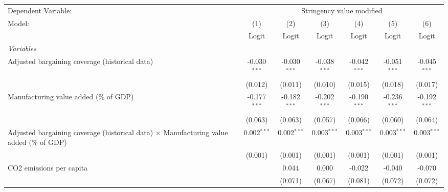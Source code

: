 
\begingroup
\centering
\begin{tabular}{lcccccc}
   \toprule
   Dependent Variable: & \multicolumn{6}{c}{Stringency value modified}\\
   Model:                                                                                          & (1)            & (2)            & (3)            & (4)            & (5)            & (6)\\  
                                                                                                   &  Logit         & Logit          & Logit          & Logit          & Logit          & Logit\\  
   \midrule
   \emph{Variables}\\
   Adjusted bargaining coverage (historical data)                                                  & -0.030$^{***}$ & -0.030$^{***}$ & -0.038$^{***}$ & -0.042$^{***}$ & -0.051$^{***}$ & -0.045$^{***}$\\   
                                                                                                   & (0.012)        & (0.011)        & (0.010)        & (0.015)        & (0.018)        & (0.017)\\   
   Manufacturing value added (\% of GDP)                                                           & -0.177$^{***}$ & -0.182$^{***}$ & -0.202$^{***}$ & -0.190$^{***}$ & -0.236$^{***}$ & -0.192$^{***}$\\   
                                                                                                   & (0.063)        & (0.063)        & (0.057)        & (0.066)        & (0.060)        & (0.064)\\   
   Adjusted bargaining coverage (historical data) $\times$ Manufacturing value added (\% of GDP)   & 0.002$^{***}$  & 0.002$^{***}$  & 0.003$^{***}$  & 0.003$^{***}$  & 0.003$^{***}$  & 0.003$^{***}$\\   
                                                                                                   & (0.001)        & (0.001)        & (0.001)        & (0.001)        & (0.001)        & (0.001)\\   
   CO2 emissions per capita                                                                        &                & 0.044          & 0.000          & -0.022         & -0.040         & -0.070\\   
                                                                                                   &                & (0.071)        & (0.067)        & (0.081)        & (0.072)        & (0.072)\\   

\end{tabular}
